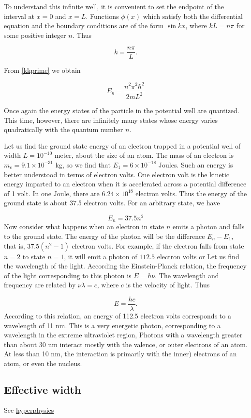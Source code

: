 To understand this infinite well, it is convenient to set the endpoint of the interval at $x = 0$ and $x = L$.  Functions $\phi(x)$ which satisfy both the differential equation and the boundary conditions are of the form $\sin kx$, where $kL = n\pi$ for some positive integer $n$. Thus

\begin{equation}
  k = \frac{n\pi}{L}.
\end{equation}

From \eqref{kkprime} we obtain

\begin{equation}
  E_n = \frac{ n^2 \pi^2 \hbar^2 }{ 2mL^2 }
\end{equation}

Once again the energy states of the particle in the potential well are quantized.  This time, however, there are infinitely many states whose energy varies quadratically with the quantum number $n$.


Let us find the ground state energy of an electron trapped in a potential well of width $L = 10^{-10}$ meter, about the size of an atom. The mass of an electron is $m_e = 9.1\times 10^{-31}$ kg, so we find that $E_1 = 6\times 10^{-18}$ Joules.  Such an energy is better understood in terms of electron volts.  One electron volt is the kinetic energy imparted to an electron when it is accelerated across a potential difference of 1 volt.  In one Joule, there are $6.24 \times 10^{18}$ electron volts.  Thus the energy of the ground state is about 37.5 electron volts.  For an arbitrary state, we have

\begin{equation}
E_n = 37.5n^2
\end{equation}
Now consider what happens when an electron in state $n$ emits a photon and falls to the ground state.  The energy of the photon will be the difference $E_n - E_1$, that is, $37.5(n^2 - 1)$ electron volts.  
For example, if the electron falls from state $n = 2$ to state $n = 1$, it
will emit a photon of $112.5$ electron volts or   Let us find the wavelength of the light.
According the Einstein-Planck relation, the frequency of the light corresponding to this photon is $E = h\nu$. The wavelength and frequency are related by $\nu\lambda = c$, where $c$ is the velocity of light.  Thus

\begin{equation}
  E = \frac{hc}{\lambda}.
\end{equation}
According to this relation, an energy of 112.5 electron volts corresponds to a wavelength of 11 nm.  This is a very energetic photon, corresponding to a wavelength in the extreme ultraviolet region,  Photons with a wavelength greater than about 30 nm interact mostly with the valence, or outer electrons of an atom.  At less than 10 nm, the interaction is primarily with the inner) electrons of an atom, or even the nucleus.

\subsection{Effective width}


See \href{http://hyperphysics.phy-astr.gsu.edu/hbase/quantum/pfbox.html}{hyperphysics}





